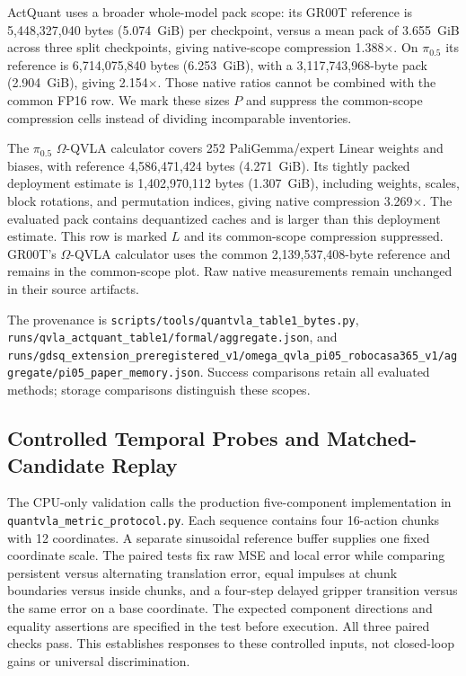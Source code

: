 ActQuant uses a broader whole-model pack scope: its GR00T reference is 5,448,327,040 bytes (5.074~GiB) per checkpoint, versus a mean pack of 3.655~GiB across three split checkpoints, giving native-scope compression 1.388$\times$. On $\pi_{0.5}$ its reference is 6,714,075,840 bytes (6.253~GiB), with a 3,117,743,968-byte pack (2.904~GiB), giving 2.154$\times$. Those native ratios cannot be combined with the common FP16 row. We mark these sizes $P$ and suppress the common-scope compression cells instead of dividing incomparable inventories.

The $\pi_{0.5}$ $\Omega$-QVLA calculator covers 252 PaliGemma/expert Linear weights and biases, with reference 4,586,471,424 bytes (4.271~GiB). Its tightly packed deployment estimate is 1,402,970,112 bytes (1.307~GiB), including weights, scales, block rotations, and permutation indices, giving native compression 3.269$\times$. The evaluated pack contains dequantized caches and is larger than this deployment estimate. This row is marked $L$ and its common-scope compression suppressed. GR00T's $\Omega$-QVLA calculator uses the common 2,139,537,408-byte reference and remains in the common-scope plot. Raw native measurements remain unchanged in their source artifacts.

The provenance is \nolinkurl{scripts/tools/quantvla_table1_bytes.py}, \nolinkurl{runs/qvla_actquant_table1/formal/aggregate.json}, and \nolinkurl{runs/gdsq_extension_preregistered_v1/omega_qvla_pi05_robocasa365_v1/aggregate/pi05_paper_memory.json}. Success comparisons retain all evaluated methods; storage comparisons distinguish these scopes.

\subsection{Controlled Temporal Probes and Matched-Candidate Replay}
\label{sec:method_validation}



The CPU-only validation calls the production five-component implementation in \texttt{quantvla\_metric\_protocol.py}. Each sequence contains four 16-action chunks with 12 coordinates. A separate sinusoidal reference buffer supplies one fixed coordinate scale. The paired tests fix raw MSE and local error while comparing persistent versus alternating translation error, equal impulses at chunk boundaries versus inside chunks, and a four-step delayed gripper transition versus the same error on a base coordinate. The expected component directions and equality assertions are specified in the test before execution. All three paired checks pass. This establishes responses to these controlled inputs, not closed-loop gains or universal discrimination.

